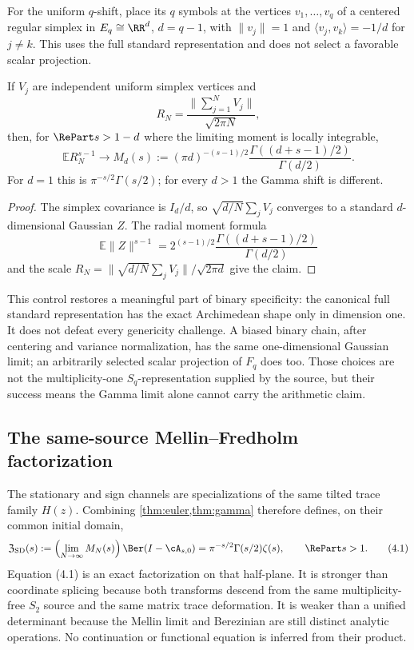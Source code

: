 For the uniform $q$-shift, place its $q$ symbols at the vertices
$v_1,\ldots,v_q$ of a centered regular simplex in
$E_q\cong\RR^{d}$, $d=q-1$, with
$\|v_j\|=1$ and $\langle v_j,v_k\rangle=-1/d$ for $j\ne k$.
This uses the full standard representation and does not select a favorable
scalar projection.

\begin{proposition}
\label{prop:qcontrol}
If $V_j$ are independent uniform simplex vertices and
\[
 R_N=\frac{\|\sum_{j=1}^NV_j\|}{\sqrt{2\pi N}},
\]
then, for $\RePart s>1-d$ where the limiting moment is locally integrable,
\[
 \mathbb E R_N^{s-1}\longrightarrow
 M_d(s):=(\pi d)^{-(s-1)/2}
 \frac{\Gamma((d+s-1)/2)}{\Gamma(d/2)}.
\]
For $d=1$ this is $\pi^{-s/2}\Gamma(s/2)$; for every $d>1$ the Gamma shift
is different.
\end{proposition}

\begin{proof}
The simplex covariance is $I_d/d$, so
$\sqrt{d/N}\sum_jV_j$ converges to a standard $d$-dimensional Gaussian $Z$.
The radial moment formula
\[
 \mathbb E\|Z\|^{s-1}
 =2^{(s-1)/2}\frac{\Gamma((d+s-1)/2)}{\Gamma(d/2)}
\]
and the scale $R_N=\|\sqrt{d/N}\sum_jV_j\|/\sqrt{2\pi d}$ give the claim.
\end{proof}

This control restores a meaningful part of binary specificity: the canonical
full standard representation has the exact Archimedean shape only in
dimension one. It does not defeat every genericity challenge. A biased
binary chain, after centering and variance normalization, has the same
one-dimensional Gaussian limit; an arbitrarily selected scalar projection of
$F_q$ does too. Those choices are not the multiplicity-one
$S_q$-representation supplied by the source, but their success means the
Gamma limit alone cannot carry the arithmetic claim.

\subsection{The same-source Mellin--Fredholm factorization}

The stationary and sign channels are specializations of the same tilted
trace family $H(z)$. Combining \cref{thm:euler,thm:gamma} therefore defines,
on their common initial domain,
\[
 \mathfrak Z_{\rm SD}(s)
 :=\left(\lim_{N\to\infty}M_N(s)\right)
   \Ber(I-\cA_{s,0})
 =\pi^{-s/2}\Gamma(s/2)\zeta(s),
 \qquad \RePart s>1.                       \tag{4.1}
\]
Equation (4.1) is an exact factorization on that half-plane. It is stronger
than coordinate splicing because both transforms descend from the same
multiplicity-free $S_2$ source and the same matrix trace deformation. It is
weaker than a unified determinant because the Mellin limit and Berezinian are
still distinct analytic operations. No continuation or functional equation
is inferred from their product.
